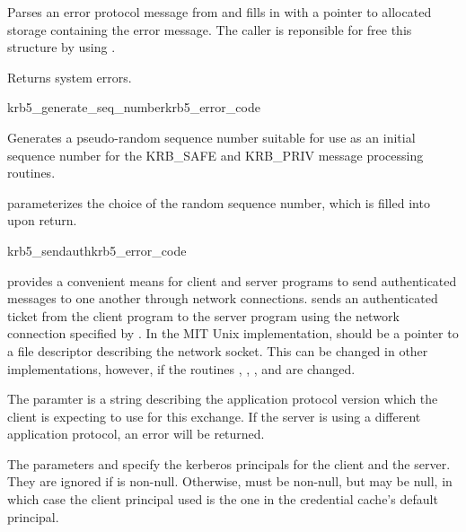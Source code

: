 Parses an error protocol message from  and fills in 
 with a pointer to allocated storage containing
the error message.  The caller is reponsible for free this structure by
using .

Returns system errors.

\begin{funcdecl}{krb5_generate_seq_number}{krb5_error_code}{\funcin}
\funcout
{}
\end{funcdecl}

Generates a pseudo-random sequence number suitable for use as an initial
sequence number for the KRB_SAFE and KRB_PRIV message processing
routines.

 parameterizes the choice of the random sequence number,
which is filled into  upon return.

\begin{funcdecl}{krb5_sendauth}{krb5_error_code}
\funcin
{}
\funcinout
{}
\funcout
{}
\end{funcdecl}

 provides a convenient means for client and
server programs to send authenticated messages to one another through
network connections.   sends an authenticated
ticket from the client program to the server program using the network
connection specified by .  In the MIT Unix implementation,
 should be a pointer to a file descriptor describing the
network socket.  This can be changed in other implementations, however,
if the routines ,
, , and
 are changed.

The paramter  is a string describing the
application protocol version which the client is expecting to use for
this exchange.  If the server is using a different application protocol,
an error will be returned.

The parameters  and  specify the
kerberos principals for the client and the server.  They are
ignored if  is non-null.  Otherwise,
 must be non-null, but  may be
null, in which case the client principal used is the one in the
credential cache's default principal.

